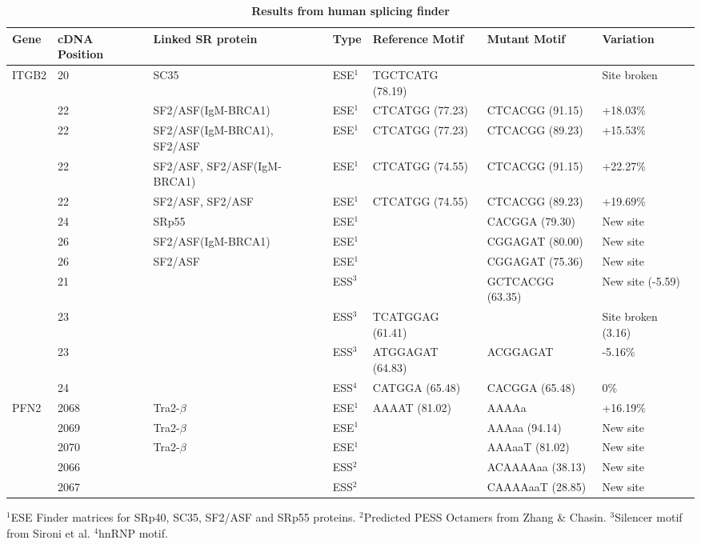 \documentclass[10pt]{article}
\begin{document}
\begin{table}[!ht]
\caption{
\bf{Results from human splicing finder}}
\begin{tabular}{|l|p{1cm}|p{3cm}|l|l|l|l|}
\hline
Gene &  cDNA Position & Linked SR protein & Type & Reference Motif & Mutant Motif & Variation \\
\hline
ITGB2 & 20 & SC35 & ESE$^{1}$ & TGCTCATG (78.19) & & Site broken \\
 & 22 & SF2/ASF(IgM-BRCA1) & ESE$^{1}$ & CTCATGG (77.23) & CTCACGG (91.15) & +18.03\% \\
 & 22 & SF2/ASF(IgM-BRCA1), SF2/ASF & ESE$^{1}$ & CTCATGG (77.23) & CTCACGG (89.23) & +15.53\% \\
 & 22 & SF2/ASF, SF2/ASF(IgM-BRCA1) & ESE$^{1}$ & CTCATGG (74.55) & CTCACGG (91.15) & +22.27\% \\
 & 22 & SF2/ASF, SF2/ASF & ESE$^{1}$ & CTCATGG (74.55) & CTCACGG (89.23) & +19.69\% \\
 & 24 & SRp55 & ESE$^{1}$ & & CACGGA (79.30) & New site \\
 & 26 & SF2/ASF(IgM-BRCA1) & ESE$^{1}$ & & CGGAGAT (80.00) & New site \\
 & 26 & SF2/ASF & ESE$^{1}$ & & CGGAGAT (75.36) & New site \\
 & 21 & & ESS$^{3}$ & & GCTCACGG (63.35) & New site (-5.59) \\
 & 23 & & ESS$^{3}$ & TCATGGAG (61.41) & & Site broken (3.16) \\
 & 23 & & ESS$^{3}$ & ATGGAGAT (64.83) & ACGGAGAT & -5.16\% \\
 & 24 & & ESS$^{4}$ & CATGGA (65.48) & CACGGA (65.48) & 0\% \\
\hline
PFN2 & 2068 & Tra2-$\beta$ & ESE$^{1}$ & AAAAT (81.02) & AAAAa & +16.19\% \\
& 2069 & Tra2-$\beta$ & ESE$^{1}$ & & AAAaa (94.14) & New site \\
& 2070 & Tra2-$\beta$ & ESE$^{1}$ & & AAAaaT (81.02) & New site \\
 & 2066 & & ESS$^{2}$ & & ACAAAAaa (38.13) & New site \\
 & 2067 & & ESS$^{2}$ & & CAAAAaaT (28.85) & New site \\
\hline

\end{tabular}
\begin{flushleft}
    $^{1}$ESE Finder matrices for SRp40, SC35, SF2/ASF and SRp55 proteins.
    $^{2}$Predicted PESS Octamers from Zhang \& Chasin.
    $^{3}$Silencer motif from Sironi et al.
    $^{4}$hnRNP motif.
\end{flushleft}
\label{tab:spliceosome}
\end{table}
\end{document}
